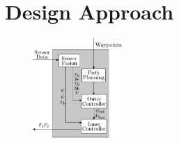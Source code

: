 \chapter{Design Approach}
\begin{figure}[H]
    \includegraphics[width=0.3\textwidth]{figures/controllerDiagram}
    \caption{}
    \label{fig:controllerDiagram}
\end{figure}